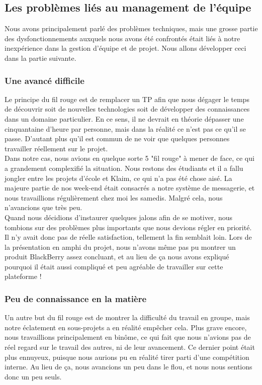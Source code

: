 \documentclass{article}
\begin{document}
	\subsection{Les problèmes liés au management de l'équipe}

	Nous avons principalement parlé des problèmes techniques, mais une grosse partie des dysfonctionnements auxquels nous avons été confrontés était liés à notre inexpérience dans la gestion d'équipe et de projet. Nous allons développer ceci dans la partie suivante. 
	
		\subsubsection{Une avancé difficile}
		Le principe du fil rouge est de remplacer un TP afin que nous dégager le temps de découvrir soit de nouvelles technologies soit de développer des connaissances dans un domaine particulier. En ce sens, il ne devrait en théorie dépasser une cinquantaine d'heure par personne, mais dans la réalité ce n'est pas ce qu'il se passe. D'autant plus qu'il est commun de ne voir que quelques personnes travailler réellement sur le projet. \\
		
		Dans notre cas, nous avions en quelque sorte 5 "fil rouge" à mener de face, ce qui a grandement complexifié la situation. Nous restons des étudiants et il a fallu jongler entre les projets d'école et Klaim, ce qui n'a pas été chose aisé. La majeure partie de nos week-end était consacrés a notre système de messagerie, et nous travaillions régulièrement chez moi les samedis. Malgré cela, nous n'avancions que très peu.\\ 
		
		Quand nous décidions d'instaurer quelques jalons afin de se motiver, nous tombions sur des problèmes plus importants que nous devions régler en priorité. Il n'y avait donc pas de réelle satisfaction, tellement la fin semblait loin. Lors de la présentation en amphi du projet, nous n'avons même pas pu montrer un produit BlackBerry assez concluant, et au lieu de ça nous avons expliqué pourquoi il était aussi compliqué et peu agréable de travailler sur cette plateforme ! \\
		
		\subsubsection{Peu de connaissance en la matière}
		Un autre but du fil rouge est de montrer la difficulté du travail en groupe, mais notre éclatement en sous-projets a en réalité empêcher cela. Plus grave encore, nous travaillions principalement en binôme, ce qui fait que nous n'avions pas de réel regard sur le travail des autres, ni de leur avancement. Ce dernier point était plus ennuyeux, puisque nous aurions pu en réalité tirer parti d'une compétition interne. Au lieu de ça, nous avancions un peu dans le flou, et nous nous sentions donc un peu seuls.\\
		
\end{document}
